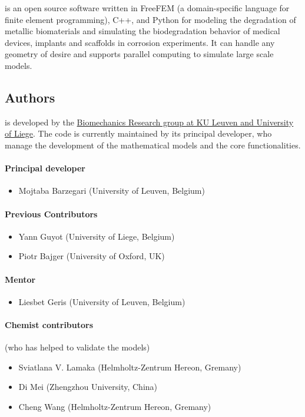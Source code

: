 \biodeg{} is an open source software written in FreeFEM (a domain-specific language for finite element programming), C++, and Python for modeling the degradation of metallic biomaterials and simulating the biodegradation behavior of medical devices, implants and scaffolds in corrosion experiments. It can handle any geometry of desire and supports parallel computing to simulate large scale models.

\subsection{Authors}
\label{sec:authors}
\biodeg{} is developed by the \href{http://www.biomech.ulg.ac.be/}{Biomechanics Research group at KU Leuven and University of Liege}. The code is currently maintained by its principal developer, 
who manage the development of the mathematical models and the core functionalities. 

\paragraph{Principal developer}
\begin{itemize}
	\item Mojtaba Barzegari (University of Leuven, Belgium)
\end{itemize}

\paragraph{Previous Contributors}
\begin{itemize}
	\item Yann Guyot (University of Liege, Belgium)
	\item Piotr Bajger (University of Oxford, UK)
\end{itemize}

\paragraph{Mentor}
\begin{itemize}
	\item Liesbet Geris (University of Leuven, Belgium)
\end{itemize}

\paragraph{Chemist contributors}
(who has helped to validate the models)
\begin{itemize}
	\item Sviatlana V. Lamaka (Helmholtz-Zentrum Hereon, Gremany)
	\item Di Mei (Zhengzhou University, China)
	\item Cheng Wang (Helmholtz-Zentrum Hereon, Gremany)
\end{itemize}

